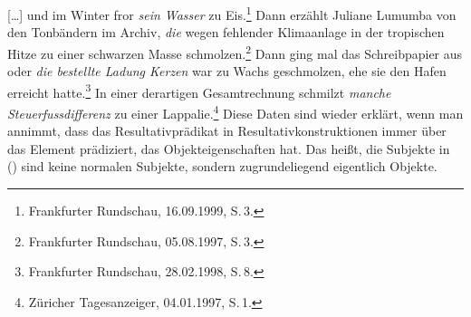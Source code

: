 \eal
\label{ex-unaccusative-result-zu-pp}
\ex\label{ex-fror-zu-eis} %
{}[\ldots] und im Winter fror \emph{sein Wasser} zu Eis.\footnote{
        Frankfurter Rundschau, 16.09.1999, S.\,3.%
}
\ex  
Dann erzählt Juliane Lumumba von den Tonbändern im Archiv, \emph{die} wegen fehlender Klimaanlage in der tropischen Hitze
     zu einer schwarzen Masse schmolzen.\footnote{
         Frankfurter Rundschau, 05.08.1997, S.\,3.%
}
\ex 
Dann ging mal das Schreibpapier aus oder \emph{die bestellte Ladung Kerzen} war zu Wachs geschmolzen, 
     ehe sie den Hafen erreicht hatte.\footnote{
Frankfurter Rundschau, 28.02.1998, S.\,8.%
}
\ex 
In einer derartigen Gesamtrechnung schmilzt \emph{manche Steuerfussdifferenz} zu einer Lappalie.\footnote{
Züricher Tagesanzeiger, 04.01.1997, S.\,1.%
}
\zl
Diese Daten sind wieder erklärt, wenn man annimmt, dass das Resultativprädikat
in Resultativkonstruktionen immer über das Element prädiziert, das Objekteigenschaften
hat. Das heißt, die Subjekte in () sind keine normalen Subjekte, sondern
zugrundeliegend eigentlich Objekte.

